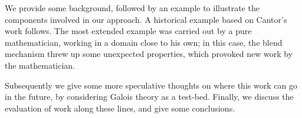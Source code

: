 We provide some background, followed by an example to illustrate the components
involved in our approach. A historical example based on Cantor's work follows.
The most extended example was carried out by a pure mathematician, working
in a domain close to his own;  in this case, the blend mechanism threw up
some unexpected properties, which provoked new work by the mathematician.

Subsequently we give some more speculative thoughts on where this work
can go in the future, by considering Galois theory as a test-bed.
Finally, we discuss the evaluation of work along these lines, and
give some conclusions.


